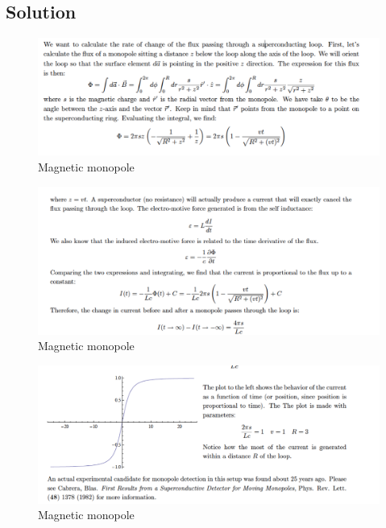 \documentclass[solutions]{esg8022pset}
\begin{document}
\subsection{Solution}

 \begin{figure}[H]
    \centering
    \includegraphics[width = 15cm]{mono_sol_a}
    \caption{Magnetic monopole}
\end{figure}

 \begin{figure}[H]
    \centering
    \includegraphics[width = 15cm]{mono_sol_b}
    \caption{Magnetic monopole}
\end{figure}

 \begin{figure}[H]
    \centering
    \includegraphics[width = 15cm]{monopole_sol_c}
    \caption{Magnetic monopole}
   \end{figure}
\end{document}

